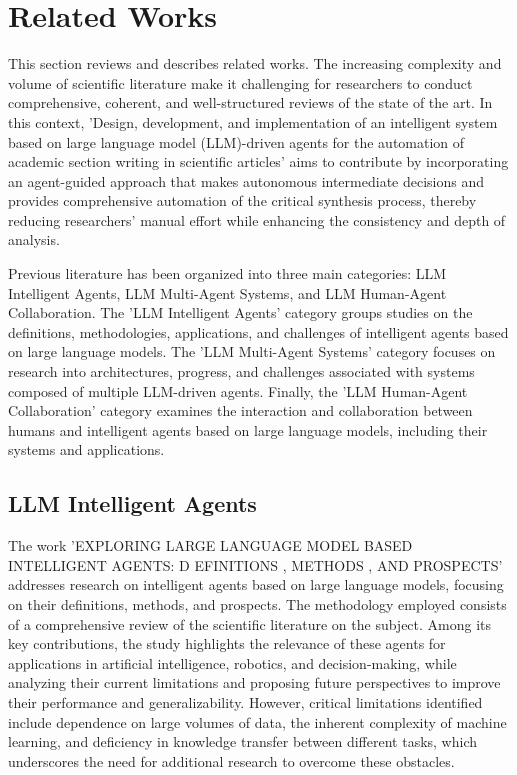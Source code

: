 \section{Related Works}
This section reviews and describes related works. The increasing complexity and volume of scientific literature make it challenging for researchers to conduct comprehensive, coherent, and well-structured reviews of the state of the art. In this context, 'Design, development, and implementation of an intelligent system based on large language model (LLM)-driven agents for the automation of academic section writing in scientific articles' aims to contribute by incorporating an agent-guided approach that makes autonomous intermediate decisions and provides comprehensive automation of the critical synthesis process, thereby reducing researchers' manual effort while enhancing the consistency and depth of analysis.

\par\par
Previous literature has been organized into three main categories: LLM Intelligent Agents, LLM Multi-Agent Systems, and LLM Human-Agent Collaboration. The 'LLM Intelligent Agents' category groups studies on the definitions, methodologies, applications, and challenges of intelligent agents based on large language models. The 'LLM Multi-Agent Systems' category focuses on research into architectures, progress, and challenges associated with systems composed of multiple LLM-driven agents. Finally, the 'LLM Human-Agent Collaboration' category examines the interaction and collaboration between humans and intelligent agents based on large language models, including their systems and applications.

\subsection{LLM Intelligent Agents}
The work 'EXPLORING LARGE LANGUAGE MODEL BASED INTELLIGENT AGENTS: D EFINITIONS , METHODS , AND PROSPECTS' \cite{ref-1} addresses research on intelligent agents based on large language models, focusing on their definitions, methods, and prospects. The methodology employed consists of a comprehensive review of the scientific literature on the subject. Among its key contributions, the study highlights the relevance of these agents for applications in artificial intelligence, robotics, and decision-making, while analyzing their current limitations and proposing future perspectives to improve their performance and generalizability. However, critical limitations identified include dependence on large volumes of data, the inherent complexity of machine learning, and deficiency in knowledge transfer between different tasks, which underscores the need for additional research to overcome these obstacles.

